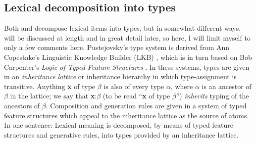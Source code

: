 \documentclass[12pt]{amsart}
\begin{document}
\subsection{Lexical decomposition into types}

Both \cite{jackendoff_semantics_1983} and \cite{pustejovsky_generative_1998} decompose lexical items into types, but in somewhat different ways. \cite{pustejovsky_generative_1998} will be discussed at length and in great detail later, so here, I will limit myself to only a few comments here. Pustejovsky's type system is derived from Ann Copestake's Linguistic Knowledge Builder (LKB) \cite{copestake_acquilex_1993} \cite{copestake_implementing_2002}, which is in turn based on Bob Carpenter's \emph{Logic of Typed Feature Structures} \cite{carpenter_logic_1992}. In these systems, types are given in an \emph{inheritance lattice} or inheritance hierarchy in which type-assignment is transitive. Anything {\bf x} of type $\beta$ is also of every type $\alpha$, where $\alpha$ is an ancestor of $\beta$ in the lattice; we say that {\bf x}:$\beta$ (to be read ``{\bf x} of type $\beta$'') \emph{inherits} typing of the ancestors of $\beta$. Composition and generation rules are given in a system of typed feature structures which appeal to the inheritance lattice as the source of atoms. In one sentence: Lexical meaning is decomposed, by means of typed feature structures and generative rules, into types provided by an inheritance lattice.
\end{document}
